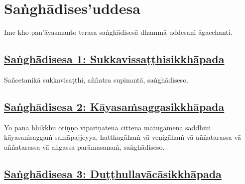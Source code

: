 
\setsecheadstyle{\sectionFmt}
\section{Saṅghādises'uddesa}
\label{sd}

\begin{intro}
	Ime kho pan'āyasmanto terasa saṅghādisesā dhammā uddesaṁ āgacchanti.
\end{intro}

\subsection*{\hyperref[comm1]{Saṅghādisesa 1: Sukkavissaṭṭhisikkhāpada}}

\label{sd1}

Sañcetanikā sukkavisaṭṭhi,\makeatletter\hyperlink{endnote38-appendix}\makeatother{} aññatra supinantā, saṅghādiseso.



\subsection*{\hyperref[comm2]{Saṅghādisesa 2: Kāyasaṁsaggasikkhāpada}}
\label{sd2}

Yo pana bhikkhu otiṇṇo vipariṇatena cittena mātugāmena saddhiṁ kāyasaṁsaggaṁ samāpajjeyya, hatthagāhaṁ\makeatletter\hyperlink{endnote39-appendix}\makeatother{} vā veṇigāhaṁ\makeatletter\hyperlink{endnote40-appendix}\makeatother{} vā aññatarassa vā aññatarassa vā aṅgassa parāmasanaṁ, saṅghādiseso.



\subsection*{\hyperref[comm3]{Saṅghādisesa 3: Duṭṭhullavācāsikkhāpada}}
\label{sd3}


